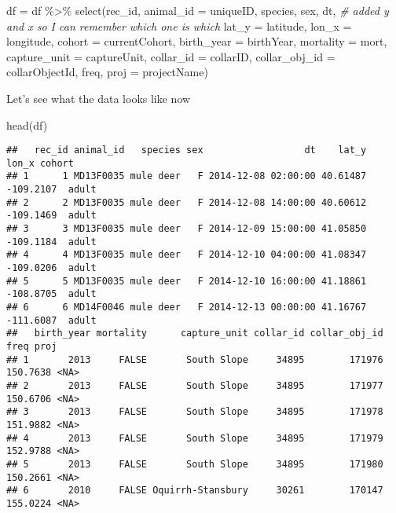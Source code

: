 \documentclass[
]{book}
\newenvironment{Shaded}{\begin{snugshade}}{\end{snugshade}}
\newcommand{\AttributeTok}[1]{\textcolor[rgb]{0.77,0.63,0.00}{#1}}
\newcommand{\CommentTok}[1]{\textcolor[rgb]{0.56,0.35,0.01}{\textit{#1}}}
\newcommand{\FunctionTok}[1]{\textcolor[rgb]{0.00,0.00,0.00}{#1}}
\newcommand{\NormalTok}[1]{#1}
\newcommand{\OtherTok}[1]{\textcolor[rgb]{0.56,0.35,0.01}{#1}}
\newcommand{\SpecialCharTok}[1]{\textcolor[rgb]{0.00,0.00,0.00}{#1}}
\begin{document}
\begin{Shaded}
\begin{Highlighting}[]
\NormalTok{df }\OtherTok{=}\NormalTok{ df }\SpecialCharTok{\%\textgreater{}\%}
  \FunctionTok{select}\NormalTok{(rec\_id, }
         \AttributeTok{animal\_id =}\NormalTok{ uniqueID,}
\NormalTok{         species,}
\NormalTok{         sex,}
\NormalTok{         dt,}
         \CommentTok{\# added y and x so I can remember which one is which}
         \AttributeTok{lat\_y =}\NormalTok{ latitude,}
         \AttributeTok{lon\_x =}\NormalTok{ longitude,}
         \AttributeTok{cohort =}\NormalTok{ currentCohort,}
         \AttributeTok{birth\_year =}\NormalTok{ birthYear,}
         \AttributeTok{mortality =}\NormalTok{ mort,}
         \AttributeTok{capture\_unit =}\NormalTok{ captureUnit,}
         \AttributeTok{collar\_id =}\NormalTok{ collarID,}
         \AttributeTok{collar\_obj\_id =}\NormalTok{ collarObjectId,}
\NormalTok{         freq,}
         \AttributeTok{proj =}\NormalTok{ projectName)}
\end{Highlighting}
\end{Shaded}

Let's see what the data looks like now

\begin{Shaded}
\begin{Highlighting}[]
\FunctionTok{head}\NormalTok{(df)}
\end{Highlighting}
\end{Shaded}

\begin{verbatim}
##   rec_id animal_id   species sex                  dt    lat_y     lon_x cohort
## 1      1 MD13F0035 mule deer   F 2014-12-08 02:00:00 40.61487 -109.2107  adult
## 2      2 MD13F0035 mule deer   F 2014-12-08 14:00:00 40.60612 -109.1469  adult
## 3      3 MD13F0035 mule deer   F 2014-12-09 15:00:00 41.05850 -109.1184  adult
## 4      4 MD13F0035 mule deer   F 2014-12-10 04:00:00 41.08347 -109.0206  adult
## 5      5 MD13F0035 mule deer   F 2014-12-10 16:00:00 41.18861 -108.8705  adult
## 6      6 MD14F0046 mule deer   F 2014-12-13 00:00:00 41.16767 -111.6087  adult
##   birth_year mortality      capture_unit collar_id collar_obj_id     freq proj
## 1       2013     FALSE       South Slope     34895        171976 150.7638 <NA>
## 2       2013     FALSE       South Slope     34895        171977 150.6706 <NA>
## 3       2013     FALSE       South Slope     34895        171978 151.9882 <NA>
## 4       2013     FALSE       South Slope     34895        171979 152.9788 <NA>
## 5       2013     FALSE       South Slope     34895        171980 150.2661 <NA>
## 6       2010     FALSE Oquirrh-Stansbury     30261        170147 155.0224 <NA>
\end{verbatim}
\end{document}
